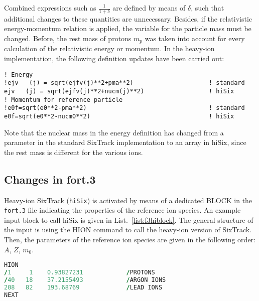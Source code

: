 Combined expressions such as $\frac{1}{1+\delta}$ are defined by means of $\delta$, such that additional changes to these quantities are unnecessary. Besides, if the relativistic energy-momentum relation is applied, the variable for the particle mass must be changed. Before, the rest mass of protons $m_p$ was taken into account for every calculation of the relativistic energy or momentum. In the heavy-ion implementation, the following definition updates have been carried out:

\begin{lstlisting}
! Energy
!ejv   (j) = sqrt(ejfv(j)**2+pma**2)                     ! standard
ejv   (j) = sqrt(ejfv(j)**2+nucm(j)**2)                  ! hiSix
! Momentum for reference particle
!e0f=sqrt(e0**2-pma**2)                                  ! standard
e0f=sqrt(e0**2-nucm0**2)                                 ! hiSix
\end{lstlisting}

Note that the nuclear mass in the energy definition has changed from a parameter in the standard SixTrack implementation to an array in hiSix, since the rest mass is different for the various ions. 



\subsection{Changes in fort.3}
Heavy-ion SixTrack (\texttt{hiSix}) is activated by means of a dedicated BLOCK in the \texttt{fort.3} file indicating the properties of the reference ion species. An example input block to call hiSix is given in List.~\ref{list:f3hiblock}. The general structure of the input is using the HION command to call the heavy-ion version of SixTrack. Then, the parameters of the reference ion species are given in the following order: $A$, $Z$, $m_0$.

\begin{lstlisting}[language=Fortran,caption={New heavy-ion block in the fort.3 file to access hiSix. In the given example, the chosen reference ion species is \lead. Lines starting with '/' are commented out.}, label={lst:test}]
HION
/1     1    0.93827231            /PROTONS
/40   18    37.2155493            /ARGON IONS
208   82    193.68769             /LEAD IONS
NEXT

\end{lstlisting}





